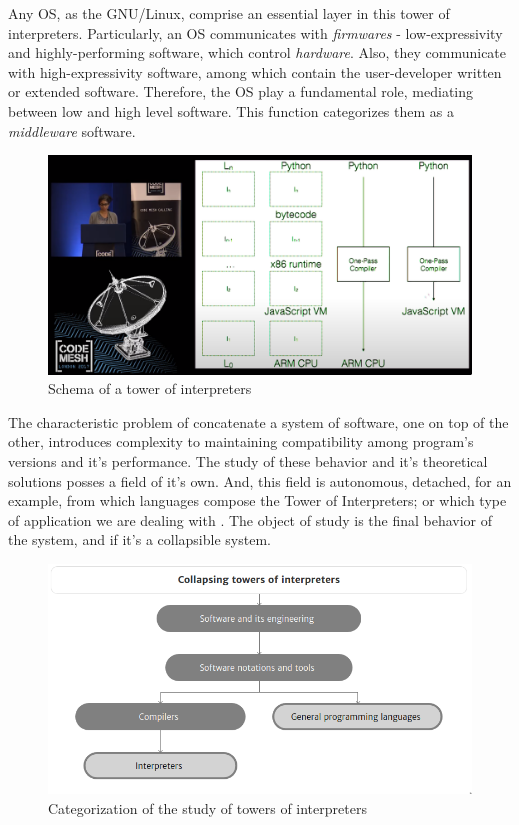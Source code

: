 \documentclass[
12pt,				%
openright,			%
oneside,			%
a4paper,			%
brazil,				%
english,			  %
]{abntex2}
\begin{document}
Any OS, as the GNU/Linux, comprise an essential layer in this tower of
interpreters. Particularly, an OS communicates with \textit{firmwares}
- low-expressivity and highly-performing software, which control
\textit{hardware}. Also, they communicate with high-expressivity
software, among which contain the user-developer written or extended
software. Therefore, the OS play a fundamental role, mediating between
low and high level software. This function categorizes them as a
\textit{middleware} software.     

\begin{figure}[ht]
  \centering
  \caption{\label{fig:tower} Schema of a tower of interpreters}
  \includegraphics[width=\linewidth]{torres.png}
\end{figure}

The characteristic problem of concatenate a system of software, one on
top of the other, introduces complexity to maintaining compatibility
among program's versions and it's performance. The study of these
behavior and it's theoretical solutions posses a field of it's
own. And, this field is autonomous, detached, for an example, from
which languages compose the Tower of Interpreters; or which type of
application we are dealing with \cite{amin2017towers}. The object of
study is the final behavior of the system, and if it's a collapsible system. 

\begin{figure}[ht]
  \centering
 \caption{\label{fig:tower2} Categorization of the study of towers of interpreters}
  \includegraphics[width=0.5\linewidth]{torres2.png}
\end{figure}
\end{document}
